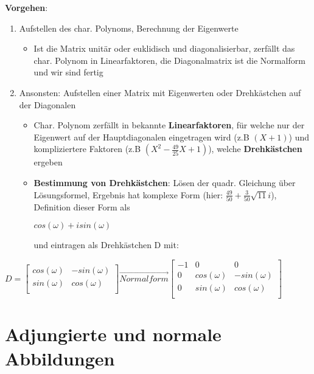 \documentclass[10pt,a4paper]{article}
\begin{document}
	\textbf{Vorgehen}:
	\begin{enumerate}
		\item Aufstellen des char. Polynoms, Berechnung der Eigenwerte
		\begin{itemize}
			\item Ist die Matrix unitär oder euklidisch und diagonalisierbar, zerfällt das char. Polynom in Linearfaktoren, die Diagonalmatrix ist die Normalform und wir sind fertig
		\end{itemize}
		\item Ansonsten: Aufstellen einer Matrix mit Eigenwerten oder Drehkästchen auf der Diagonalen
		\begin{itemize}
			\item Char. Polynom zerfällt in bekannte \textbf{Linearfaktoren}, für welche nur der Eigenwert auf der Hauptdiagonalen eingetragen wird (z.B $(X + 1)$) und kompliziertere Faktoren (z.B $(X^2 - \frac{49}{25}X + 1)$), welche \textbf{Drehkästchen} ergeben
			\item \textbf{Bestimmung von Drehkästchen}: Lösen der quadr. Gleichung über Lösungsformel, Ergebnis hat komplexe Form (hier: $\frac{49}{50} + \frac{3}{50}\sqrt{11}i$), Definition dieser Form als
			\begin{center}
				$cos(\omega) + isin(\omega)$
			\end{center}
			und eintragen als Drehkästchen D mit:
		\end{itemize}
	\end{enumerate}
		\begin{center}
		$D = \begin{bmatrix}
			cos(\omega) & -sin(\omega)\\
			sin(\omega) & cos(\omega)\\
		\end{bmatrix}
	\overrightarrow{Normalform}
		\begin{bmatrix}
			-1 & 0 & 0 \\
			0 & cos(\omega) & -sin(\omega)\\
			0 & sin(\omega) & cos(\omega)\\
		\end{bmatrix}$
	\end{center}
	
	\newpage
	\section{Adjungierte und normale Abbildungen}
	\label{aa:sec:adjungierte_und_normale_abbildungen}
	
\end{document}
